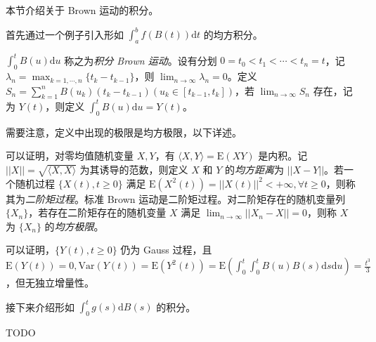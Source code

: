 \documentclass[../main.tex]{subfiles}
\begin{document}
本节介绍关于 Brown 运动的积分。

首先通过一个例子引入形如 $\int_a^bf(B(t))\mathrm dt$ 的均方积分。

\begin{example}
    $\int_0^tB(u)\mathrm du$ 称之为\emph{积分 Brown 运动}。设有分划 $0=t_0<t_1<\cdots<t_n=t$，记 $\lambda_n=\max_{k=1,\cdots,n}\{t_k-t_{k-1}\}$，则 $\lim_{n\rightarrow\infty}\lambda_n=0$。定义 $S_n=\sum_{k=1}^nB(u_k)(t_k-t_{k-1})(u_k\in[t_{k-1},t_k])$，若 $\lim_{n\rightarrow\infty}S_n$ 存在，记为 $Y(t)$，则定义 $\int_0^tB(u)\mathrm du=Y(t)$。
\end{example}

需要注意，定义中出现的极限是均方极限，以下详述。

\begin{definition}\label{def:8.5.1}
    可以证明，对零均值随机变量 $X,Y$，有 $\langle X,Y\rangle=\mathrm E(XY)$ 是内积。记 $||X||=\sqrt{\langle X,X\rangle}$ 为其诱导的范数，则定义 $X$ 和 $Y$ 的\emph{均方距离}为 $||X-Y||$。若一个随机过程 $\{X(t),t\geq0\}$ 满足 $\mathrm E(X^2(t))=||X(t)||^2<+\infty,\forall t\geq0$，则称其为\emph{二阶矩过程}。标准 Brown 运动是二阶矩过程。对二阶矩存在的随机变量列 $\{X_n\}$，若存在二阶矩存在的随机变量 $X$ 满足 $\lim_{n\rightarrow\infty}||X_n-X||=0$，则称 $X$ 为 $\{X_n\}$ 的\emph{均方极限}。
\end{definition}

可以证明，$\{Y(t),t\geq0\}$ 仍为 Gauss 过程，且 $\mathrm E(Y(t))=0,\mathrm{Var}(Y(t))=\mathrm E(Y^2(t))=\mathrm E(\int_0^t\int_0^tB(u)B(s)\mathrm ds\mathrm du)=\frac{t^3}3$，但无独立增量性。

接下来介绍形如 $\int_0^tg(s)\mathrm dB(s)$ 的积分。

\begin{definition}\label{def:8.5.2}
    TODO
\end{definition}
\end{document}
